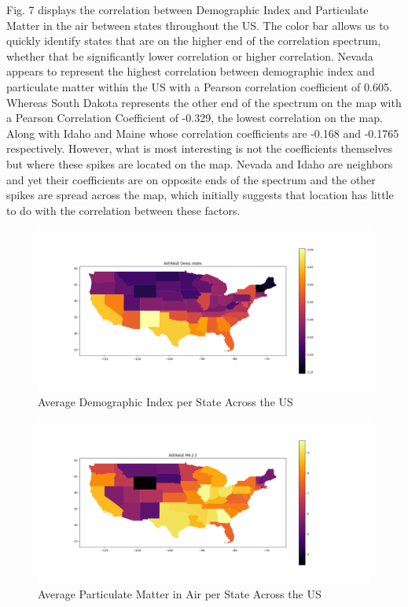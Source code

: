 \documentclass[letterpaper, 10 pt, conference]{ieeeconf}  %
\begin{document}
\par
Fig. 7 displays the correlation between Demographic Index and Particulate Matter in the air between states throughout the US. The color bar allows us to quickly identify states that are on the higher end of the correlation spectrum, whether that be significantly lower correlation or higher correlation. Nevada appears to represent the highest correlation between demographic index and particulate matter within the US with a Pearson correlation coefficient of 0.605. Whereas South Dakota represents the other end of the spectrum on the map with a Pearson Correlation Coefficient of -0.329, the lowest correlation on the map. Along with Idaho and Maine whose correlation coefficients are -0.168 and -0.1765 respectively. However, what is most interesting is not the coefficients themselves but where these spikes are located on the map. Nevada and Idaho are neighbors and yet their coefficients are on opposite ends of the spectrum and the other spikes are spread across the map, which initially suggests that location has little to do with the correlation between these factors. \par
\begin{figure}
    \centering
    \includegraphics[width=1\linewidth]{Images/AverageDemo-Index.png}
    \caption{Average Demographic Index per State Across the US}
    \label{fig:enter-label}
\end{figure}
\begin{figure}
    \centering
    \includegraphics[width=1\linewidth]{Images/AveragePM-2.5.png}
    \caption{Average Particulate Matter in Air per State Across the US}
    \label{fig:enter-label}
\end{figure}
\end{document}
